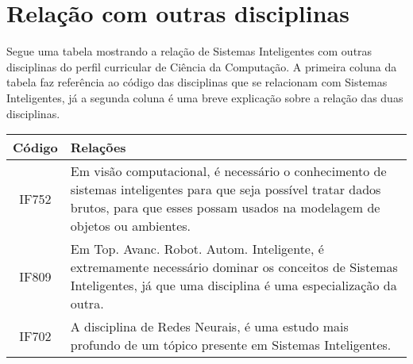 \documentclass[10pt]{article}
\begin{document}
    

\section{Relação com outras disciplinas}
    Segue uma tabela mostrando a relação de Sistemas Inteligentes com outras disciplinas do perfil curricular de Ciência da Computação. A primeira coluna da tabela faz referência ao código das disciplinas que se relacionam com Sistemas Inteligentes, já a segunda coluna é uma breve explicação sobre a relação das duas disciplinas.
    \begin{center}
    \begin{tabular}{|c|p{10cm}|}
        \hline
        Código & Relações \\ \hline
        IF752 & Em visão computacional, é necessário o conhecimento de sistemas inteligentes para que seja possível tratar dados brutos, para que esses possam usados na modelagem de objetos ou ambientes. \\ \hline
        IF809 & Em Top. Avanc. Robot. Autom. Inteligente, é extremamente necessário dominar os conceitos de Sistemas Inteligentes, já que uma disciplina é uma especialização da outra. \\ \hline
        IF702 & A disciplina de Redes Neurais, é uma estudo mais profundo de um tópico presente em  Sistemas Inteligentes.\\ \hline
        
    \end{tabular}
    \end{center}



\end{document}
